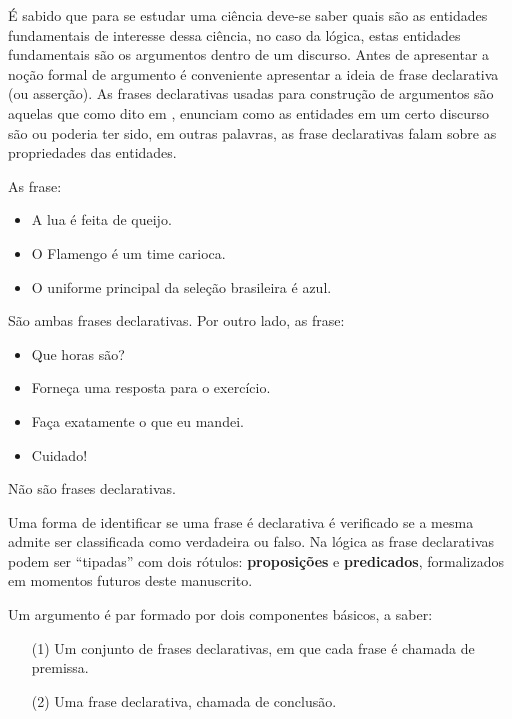 É sabido que para se estudar uma ciência deve-se saber quais são as entidades fundamentais de interesse dessa ciência, no caso da lógica, estas entidades fundamentais são os argumentos dentro de um discurso. Antes de apresentar a noção formal de argumento é conveniente apresentar a ideia de frase declarativa (ou asserção). As frases declarativas usadas para construção de argumentos são aquelas que como dito em \cite{joaoPavao2014}, enunciam como as entidades em um certo discurso são ou poderia ter sido, em outras palavras, as frase declarativas falam sobre as propriedades das entidades.

\begin{example}\label{exe:FrasesDeclarativas}
    As frase:
	\begin{itemize}
		\item A lua é feita de queijo.
		\item O Flamengo é um time carioca.
		\item O uniforme principal da seleção brasileira é azul.
	\end{itemize}
	São ambas frases declarativas. Por outro lado, as frase:
	\begin{itemize}
		\item Que horas são?
		\item Forneça uma resposta para o exercício.
		\item Faça exatamente o que eu mandei.
		\item Cuidado!
	\end{itemize}
	Não são frases declarativas.
\end{example}

Uma forma de identificar se uma frase é declarativa é verificado se a mesma admite ser classificada como verdadeira ou falso.  Na lógica as frase declarativas podem ser ``tipadas'' com dois rótulos: \textbf{proposições} e \textbf{predicados}, formalizados em momentos futuros deste manuscrito. 

\begin{definition}[Argumento]\label{def:Argumento}
	Um argumento é par formado por dois componentes básicos, a saber:
	\begin{itemize}
		\item[(1)] Um conjunto de frases declarativas, em que cada frase é chamada de premissa.
		\item[(2)] Uma frase declarativa, chamada de conclusão.
	\end{itemize}
\end{definition}

